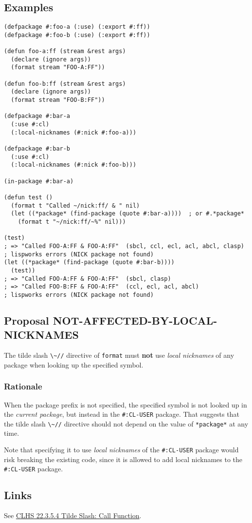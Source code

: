 \documentclass[11pt]{article}
\begin{document}
\subsection{Examples}
\label{sec:orgf7afc50}
\begin{verbatim}
(defpackage #:foo-a (:use) (:export #:ff))
(defpackage #:foo-b (:use) (:export #:ff))

(defun foo-a:ff (stream &rest args)
  (declare (ignore args))
  (format stream "FOO-A:FF"))

(defun foo-b:ff (stream &rest args)
  (declare (ignore args))
  (format stream "FOO-B:FF"))

(defpackage #:bar-a
  (:use #:cl)
  (:local-nicknames (#:nick #:foo-a)))

(defpackage #:bar-b
  (:use #:cl)
  (:local-nicknames (#:nick #:foo-b)))

(in-package #:bar-a)

(defun test ()
  (format t "Called ~/nick:ff/ & " nil)
  (let ((*package* (find-package (quote #:bar-a))))  ; or #.*package*
    (format t "~/nick:ff/~%" nil)))

(test)
; => "Called FOO-A:FF & FOO-A:FF"  (sbcl, ccl, ecl, acl, abcl, clasp)
; lispworks errors (NICK package not found)
(let ((*package* (find-package (quote #:bar-b))))
  (test))
; => "Called FOO-A:FF & FOO-A:FF"  (sbcl, clasp)
; => "Called FOO-B:FF & FOO-A:FF"  (ccl, ecl, acl, abcl)
; lispworks errors (NICK package not found)
\end{verbatim}
\subsection{Proposal NOT-AFFECTED-BY-LOCAL-NICKNAMES}
\label{sec:orgbfe6e5d}
The tilde slash \texttt{\textbackslash{}\textasciitilde{}//} directive of \texttt{format} must \textbf{not} use \emph{local nicknames} of
any package when looking up the specified symbol.
\subsubsection{Rationale}
\label{sec:org24f46e2}
When the package prefix is not specified, the specified symbol is not looked up
in the \emph{current package}, but instead in the \texttt{\#:CL-USER} package. That suggests
that the tilde slash \texttt{\textbackslash{}\textasciitilde{}//} directive should not depend on the value of
\texttt{*package*} at any time.

Note that specifying it to use \emph{local nicknames} of the \texttt{\#:CL-USER} package would
risk breaking the existing code, since it is allowed to add local nicknames to
the \texttt{\#:CL-USER} package.
\subsection{Links}
\label{sec:orgc0eb55a}
See \href{https://www.lispworks.com/documentation/HyperSpec/Body/22\_ced.htm}{CLHS 22.3.5.4 Tilde Slash: Call Function}.
\end{document}
